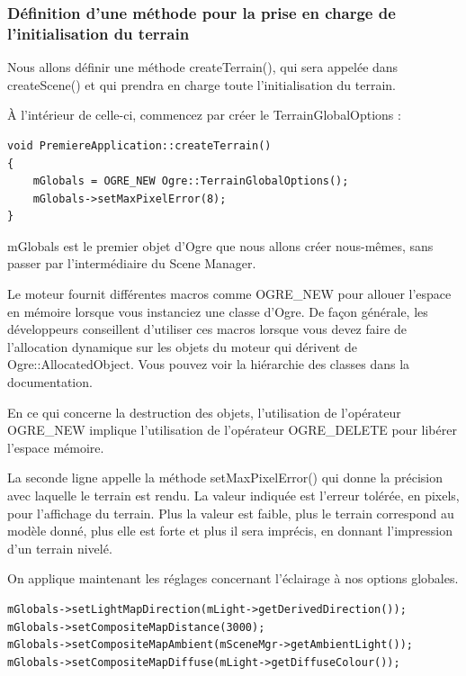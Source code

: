 \documentclass[10pt,a4paper]{report}
\begin{document}
\subsubsection{D\'efinition d'une m\'ethode pour la prise en charge de l'initialisation du terrain}

Nous allons d\'efinir une m\'ethode createTerrain(), qui sera appel\'ee dans createScene() et qui prendra en charge toute l'initialisation du terrain.

\`A l'int\'erieur de celle-ci, commencez par cr\'eer le TerrainGlobalOptions :

\begin{lstlisting}[caption={M\'ethode pour la prise en charge de l'initialisation du terrain}]
void PremiereApplication::createTerrain()
{
    mGlobals = OGRE_NEW Ogre::TerrainGlobalOptions();
    mGlobals->setMaxPixelError(8);
}
\end{lstlisting}

mGlobals est le premier objet d'Ogre que nous allons cr\'eer nous-m\^emes, sans passer par l'interm\'ediaire du Scene Manager.

Le moteur fournit diff\'erentes macros comme OGRE\_NEW pour allouer l'espace en m\'emoire lorsque vous instanciez une classe d'Ogre. De fa\c{c}on g\'en\'erale, les d\'eveloppeurs conseillent d'utiliser ces macros lorsque vous devez faire de l'allocation dynamique sur les objets du moteur qui d\'erivent de Ogre::AllocatedObject. Vous pouvez voir la hi\'erarchie des classes dans la documentation.

En ce qui concerne la destruction des objets, l'utilisation de l'op\'erateur OGRE\_NEW implique l'utilisation de l'op\'erateur OGRE\_DELETE pour lib\'erer l'espace m\'emoire.

La seconde ligne appelle la m\'ethode setMaxPixelError() qui donne la pr\'ecision avec laquelle le terrain est rendu. La valeur indiqu\'ee est l'erreur tol\'er\'ee, en pixels, pour l'affichage du terrain. Plus la valeur est faible, plus le terrain correspond au mod\`ele donn\'e, plus elle est forte et plus il sera impr\'ecis, en donnant l'impression d'un terrain nivel\'e.

On applique maintenant les r\'eglages concernant l'\'eclairage \`a nos options globales.

\begin{lstlisting}[caption={Application des r\'eglages}]
mGlobals->setLightMapDirection(mLight->getDerivedDirection());
mGlobals->setCompositeMapDistance(3000);
mGlobals->setCompositeMapAmbient(mSceneMgr->getAmbientLight());
mGlobals->setCompositeMapDiffuse(mLight->getDiffuseColour());
\end{lstlisting}
\end{document}
